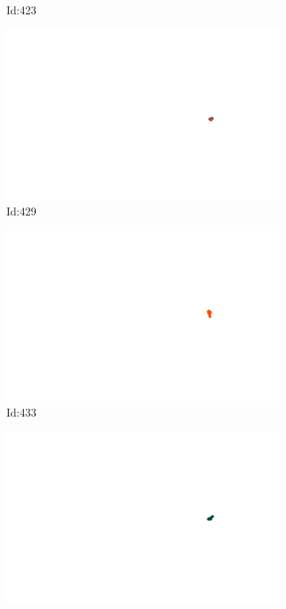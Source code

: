 \documentclass[12pt,twoside]{report}
\begin{document}
\begin{figure}
\begin{subfigure}[b]{0.20\textwidth}
\caption{Id:423}
\end{subfigure}
\begin{subfigure}[b]{0.20\textwidth}
\centering
\includegraphics[width=\textwidth]{../../trajectories/429.png}
\caption{Id:429}
\end{subfigure}
\begin{subfigure}[b]{0.20\textwidth}
\centering
\includegraphics[width=\textwidth]{../../trajectories/433.png}
\caption{Id:433}
\end{subfigure}
\begin{subfigure}[b]{0.20\textwidth}
\centering
\includegraphics[width=\textwidth]{../../trajectories/479.png}

\end{subfigure}
\end{figure}
\end{document}
